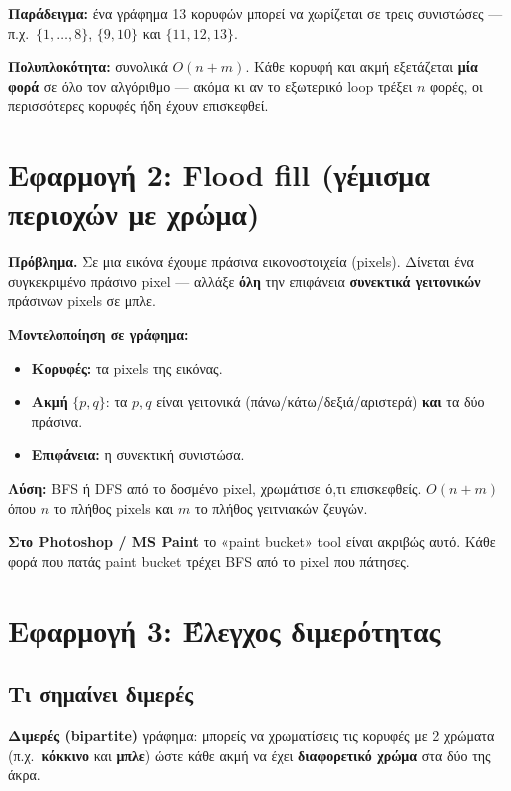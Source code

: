 \documentclass[11pt,a4paper]{article}
\begin{document}
\textbf{Παράδειγμα:} ένα γράφημα 13 κορυφών μπορεί να χωρίζεται σε τρεις
συνιστώσες --- π.χ.\ $\{1, \dots, 8\}$, $\{9, 10\}$ και $\{11, 12, 13\}$.

\textbf{Πολυπλοκότητα:} συνολικά $O(n + m)$. Κάθε κορυφή και ακμή εξετάζεται
\textbf{μία φορά} σε όλο τον αλγόριθμο --- ακόμα κι αν το εξωτερικό loop τρέξει
$n$ φορές, οι περισσότερες κορυφές ήδη έχουν επισκεφθεί.

\section{Εφαρμογή 2: Flood fill (γέμισμα περιοχών με χρώμα)}

\textbf{Πρόβλημα.} Σε μια εικόνα έχουμε πράσινα εικονοστοιχεία (pixels). Δίνεται
ένα συγκεκριμένο πράσινο pixel --- αλλάξε \textbf{όλη} την επιφάνεια
\textbf{συνεκτικά γειτονικών} πράσινων pixels σε μπλε.

\textbf{Μοντελοποίηση σε γράφημα:}
\begin{itemize}
  \item \textbf{Κορυφές:} τα pixels της εικόνας.
  \item \textbf{Ακμή} $\{p, q\}$: τα $p, q$ είναι γειτονικά
  (πάνω/κάτω/δεξιά/αριστερά) \textbf{και} τα δύο πράσινα.
  \item \textbf{Επιφάνεια:} η συνεκτική συνιστώσα.
\end{itemize}
\textbf{Λύση:} BFS ή DFS από το δοσμένο pixel, χρωμάτισε ό,τι επισκεφθείς.
$O(n + m)$ όπου $n$ το πλήθος pixels και $m$ το πλήθος γειτνιακών ζευγών.

\begin{intuition}
\textbf{Στο Photoshop / MS Paint} το «paint bucket» tool είναι ακριβώς αυτό.
Κάθε φορά που πατάς paint bucket τρέχει BFS από το pixel που πάτησες.
\end{intuition}

\section{Εφαρμογή 3: Έλεγχος διμερότητας}

\subsection{Τι σημαίνει διμερές}

\textbf{Διμερές (bipartite)} γράφημα: μπορείς να χρωματίσεις τις κορυφές με 2
χρώματα (π.χ.\ \textbf{κόκκινο} και \textbf{μπλε}) ώστε κάθε ακμή να έχει
\textbf{διαφορετικό χρώμα} στα δύο της άκρα.
\end{document}
